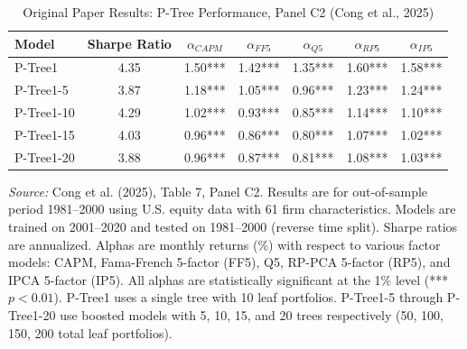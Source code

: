 \begin{table}[htbp]
\centering
\caption{Original Paper Results: P-Tree Performance, Panel C2 (Cong et al., 2025)}
\label{tab:original_paper_c2}
\setlength{\tabcolsep}{5pt}
\renewcommand{\arraystretch}{1.1}
\small
\begin{tabular}{lcccccc}
\hline
Model & Sharpe Ratio & $\alpha_{CAPM}$ & $\alpha_{FF5}$ & $\alpha_{Q5}$ & $\alpha_{RP5}$ & $\alpha_{IP5}$ \\
\hline
P-Tree1 & 4.35 & 1.50*** & 1.42*** & 1.35*** & 1.60*** & 1.58*** \\
P-Tree1-5 & 3.87 & 1.18*** & 1.05*** & 0.96*** & 1.23*** & 1.24*** \\
P-Tree1-10 & 4.29 & 1.02*** & 0.93*** & 0.85*** & 1.14*** & 1.10*** \\
P-Tree1-15 & 4.03 & 0.96*** & 0.86*** & 0.80*** & 1.07*** & 1.02*** \\
P-Tree1-20 & 3.88 & 0.96*** & 0.87*** & 0.81*** & 1.08*** & 1.03*** \\
\hline
\end{tabular}

\vspace{0.2cm}
\begin{minipage}{0.95\textwidth}
\footnotesize
\textit{Source:} Cong et al. (2025), Table 7, Panel C2. Results are for out-of-sample period 1981--2000
using U.S. equity data with 61 firm characteristics. Models are trained on 2001--2020 and tested on 1981--2000
(reverse time split). Sharpe ratios are annualized. Alphas are monthly returns (\%) with respect to various
factor models: CAPM, Fama-French 5-factor (FF5), Q5, RP-PCA 5-factor (RP5), and IPCA 5-factor (IP5).
All alphas are statistically significant at the 1\% level (*** $p<0.01$). P-Tree1 uses a single tree
with 10 leaf portfolios. P-Tree1-5 through P-Tree1-20 use boosted models with 5, 10, 15, and 20 trees
respectively (50, 100, 150, 200 total leaf portfolios).
\end{minipage}
\end{table}
